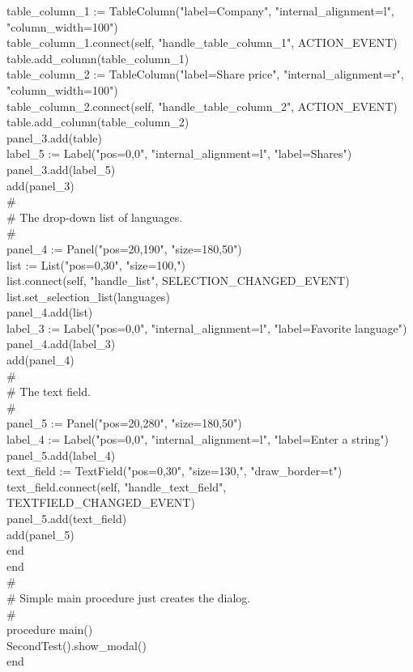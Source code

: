 {\>\>table\_column\_1 := TableColumn("label=Company", "internal\_alignment=l", \\
\>\>\>\>\>\>"column\_width=100") \\
\>\>table\_column\_1.connect(self, "handle\_table\_column\_1", ACTION\_EVENT) \\
\>\>table.add\_column(table\_column\_1) \\
\>\>table\_column\_2 := TableColumn("label=Share price", "internal\_alignment=r", \\
\>\>\>\>\>\>"column\_width=100") \\
\>\>table\_column\_2.connect(self, "handle\_table\_column\_2", ACTION\_EVENT) \\
\>\>table.add\_column(table\_column\_2) \\
\>\>panel\_3.add(table) \\
\>\>label\_5 := Label("pos=0,0", "internal\_alignment=l", "label=Shares") \\
\>\>panel\_3.add(label\_5) \\
\>\>add(panel\_3) \\
\>\>\# \\
\>\>\# The drop-down list of languages. \\
\>\>\# \\
\>\>panel\_4 := Panel("pos=20,190", "size=180,50") \\
\>\>list := List("pos=0,30", "size=100,") \\
\>\>list.connect(self, "handle\_list", SELECTION\_CHANGED\_EVENT) \\
\>\>list.set\_selection\_list(languages) \\
\>\>panel\_4.add(list) \\
\>\>label\_3 := Label("pos=0,0", "internal\_alignment=l", "label=Favorite language") \\
\>\>panel\_4.add(label\_3) \\
\>\>add(panel\_4) \\
\>\>\# \\
\>\>\# The text field. \\
\>\>\# \\
\>\>panel\_5 := Panel("pos=20,280", "size=180,50") \\
\>\>label\_4 := Label("pos=0,0", "internal\_alignment=l", "label=Enter a string") \\
\>\>panel\_5.add(label\_4) \\
\>\>text\_field := TextField("pos=0,30", "size=130,", "draw\_border=t") \\
\>\>text\_field.connect(self, "handle\_text\_field", TEXTFIELD\_CHANGED\_EVENT) \\
\>\>panel\_5.add(text\_field) \\
\>\>add(panel\_5) \\
\>end \\
end \\
\# \\
\# Simple main procedure just creates the dialog. \\
\# \\
procedure main() \\
\>SecondTest().show\_modal() \\
end
}


